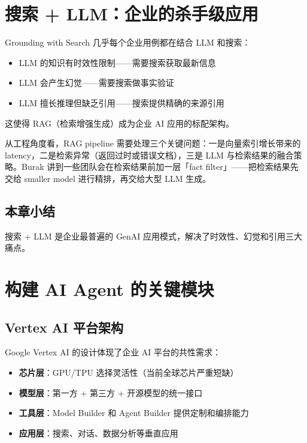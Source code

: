 \documentclass[a4paper]{article}
\begin{document}
\section{搜索 + LLM：企业的杀手级应用}

\begin{importantbox}{Grounding with Search}
几乎每个企业用例都在结合 LLM 和搜索：
\begin{itemize}
    \item LLM 的知识有时效性限制——需要搜索获取最新信息
    \item LLM 会产生幻觉——需要搜索做事实验证
    \item LLM 擅长推理但缺乏引用——搜索提供精确的来源引用
\end{itemize}
这使得 RAG（检索增强生成）成为企业 AI 应用的标配架构。
\end{importantbox}

从工程角度看，RAG pipeline 需要处理三个关键问题：一是向量索引增长带来的 latency，二是检索异常（返回过时或错误文档），三是 LLM 与检索结果的融合策略。Burak 讲到一些团队会在检索结果前加一层「fact filter」——把检索结果先交给 smaller model 进行精排，再交给大型 LLM 生成。

\subsection{本章小结}

搜索 + LLM 是企业最普遍的 GenAI 应用模式，解决了时效性、幻觉和引用三大痛点。

\section{构建 AI Agent 的关键模块}

\subsection{Vertex AI 平台架构}

Google Vertex AI 的设计体现了企业 AI 平台的共性需求：

\begin{itemize}
    \item \textbf{芯片层}：GPU/TPU 选择灵活性（当前全球芯片严重短缺）
    \item \textbf{模型层}：第一方 + 第三方 + 开源模型的统一接口
    \item \textbf{工具层}：Model Builder 和 Agent Builder 提供定制和编排能力
    \item \textbf{应用层}：搜索、对话、数据分析等垂直应用
\end{itemize}
\end{document}
